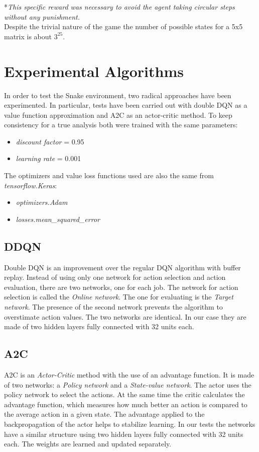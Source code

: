 \documentclass[conference]{IEEEtran}
\begin{document}
*\textit{This specific reward was necessary to avoid the agent taking circular steps without any punishment.} \\
Despite the trivial nature of the game the number of possible states for a 5x5 matrix is about $3^{25}$.

\section{Experimental Algorithms}
In order to test the Snake environment, two radical approaches have been experimented. In particular, tests have been carried out with double DQN
as a value function approximation and A2C as an actor-critic method. To keep consistency for a true analysis both were trained with the same parameters:
\begin{itemize}
    \item \textit{discount factor} = 0.95
    \item \textit{learning rate} = 0.001
\end{itemize}
The optimizers and value loss functions used are also the same from \textit{tensorflow.Keras}:
\begin{itemize}
    \item \textit{optimizers.Adam}
    \item \textit{losses.mean\_squared\_error}
\end{itemize}

\subsection{DDQN}
Double DQN\cite{b1} is an improvement over the regular DQN algorithm with buffer replay. Instead of using only one network for action selection and action evaluation,
there are two networks, one for each job. The network for action selection is called the \textit{Online network}. The one for evaluating is the \textit{Target network}.
The presence of the second network prevents the algorithm to overstimate action values. The two networks are identical.
In our case they are made of two hidden layers fully connected with 32 units each.

\subsection{A2C}
A2C is an \textit{Actor-Critic} method \cite{b2} with the use of an advantage function. It is made of two networks: a \textit{Policy network} and a \textit{State-value network}.
The actor uses the policy network to select the actions. At the same time the critic calculates the advantage function, which
measures how much better an action is compared to the average action in a given state.
The advantage applied to the backpropagation of the actor helps to stabilize learning.
In our tests the networks have a similar structure using two hidden layers fully connected with 32 units each. The weights are learned and updated separately.
\end{document}
